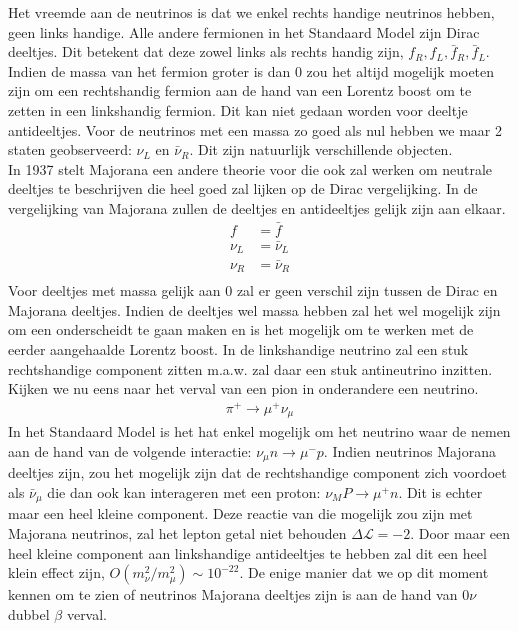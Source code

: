 \documentclass[../main.tex]{subfiles}
\begin{document}
Het vreemde aan de neutrinos is dat we enkel rechts handige neutrinos hebben, geen links handige. Alle andere fermionen in het Standaard Model zijn Dirac deeltjes. Dit betekent dat deze zowel links als rechts handig zijn, $f_{R}, f_{L}, \bar{f}_{R}, \bar{f}_{L}$. Indien de massa van het fermion groter is dan 0 zou het altijd mogelijk moeten zijn om een rechtshandig fermion aan de hand van een Lorentz boost om te zetten in een linkshandig fermion. Dit kan niet gedaan worden voor deeltje antideeltjes. Voor de neutrinos met een massa zo goed als nul hebben we maar 2 staten geobserveerd: $\nu_L$ en $\bar{\nu}_R$. Dit zijn natuurlijk verschillende objecten.\\
In 1937 stelt Majorana een andere theorie voor die ook zal werken om neutrale deeltjes te beschrijven die heel goed zal lijken op de Dirac vergelijking. In de vergelijking van Majorana zullen de deeltjes en antideeltjes gelijk zijn aan elkaar.
\begin{equation}
    \begin{aligned}
        \label{eq:majorana_deeltjes}
        f &= \bar{f}\\
        \nu_L &= \bar{\nu}_L\\
        \nu_R &= \bar{\nu}_R\\
    \end{aligned}
\end{equation}
Voor deeltjes met massa gelijk aan 0 zal er geen verschil zijn tussen de Dirac en Majorana deeltjes. Indien de deeltjes wel massa hebben zal het wel mogelijk zijn om een onderscheidt te gaan maken en is het mogelijk om te werken met de eerder aangehaalde Lorentz boost. In de linkshandige neutrino zal een stuk rechtshandige component zitten m.a.w. zal daar een stuk antineutrino inzitten.\\
Kijken we nu eens naar het verval van een pion in onderandere een neutrino.
\begin{equation}
    \begin{aligned}
        \label{eq:pion_neutrino_verval}
        \pi^{+} \rightarrow \mu^{+} \nu_{\mu}
    \end{aligned}
\end{equation}
In het Standaard Model is het hat enkel mogelijk om het neutrino waar de nemen aan de hand van de volgende interactie: $\nu_{\mu} n \rightarrow \mu^{-} p$. Indien neutrinos Majorana deeltjes zijn, zou het mogelijk zijn dat de rechtshandige component zich voordoet als $\bar{\nu}_\mu$ die dan ook kan interageren met een proton: $\nu_M P \longrightarrow \mu^{+} n$. Dit is echter maar een heel kleine component. Deze reactie van die mogelijk zou zijn met Majorana neutrinos, zal het lepton getal niet behouden $\Delta \mathcal{L}=-2$. Door maar een heel kleine component aan linkshandige antideeltjes te hebben zal dit een heel klein effect zijn, $O\left(m_{\nu}^{2} / m_{\mu}^{2}\right) \sim 10^{-22}$. De enige manier dat we op dit moment kennen om te zien of neutrinos Majorana deeltjes zijn is aan de hand van $0\nu$ dubbel $\beta$ verval.
\end{document}
